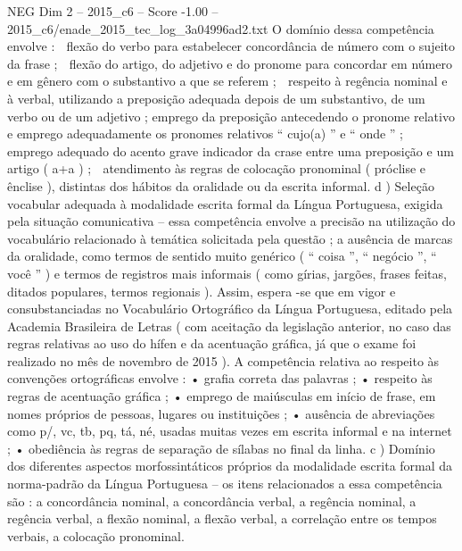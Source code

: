 \begin{textsample}{NEG Dim 2 – 2015\_c6 – Score -1.00 – 2015\_c6/enade\_2015\_tec\_log\_3a04996ad2.txt}
O domínio dessa competência envolve :  flexão do verbo para estabelecer concordância de número com o sujeito da frase ;  flexão do artigo, do adjetivo e do pronome para concordar em número e em gênero com o substantivo a que se referem ;  respeito à regência nominal e à verbal, utilizando a preposição adequada depois de um substantivo, de um verbo ou de um adjetivo ; emprego da preposição antecedendo o pronome relativo e emprego adequadamente os pronomes relativos “ cujo(a) ” e “ onde ” ;  emprego adequado do acento grave indicador da crase entre uma preposição e um artigo ( a+a ) ;  atendimento às regras de colocação pronominal ( próclise e ênclise ), distintas dos hábitos da oralidade ou da escrita informal. d ) Seleção vocabular adequada à modalidade escrita formal da Língua Portuguesa, exigida pela situação comunicativa – essa competência envolve a precisão na utilização do vocabulário relacionado à temática solicitada pela questão ; a ausência de marcas da oralidade, como termos de sentido muito genérico ( “ coisa ”, “ negócio ”, “ você ” ) e termos de registros mais informais ( como gírias, jargões, frases feitas, ditados populares, termos regionais ).
Assim, espera -se que em vigor e consubstanciadas no Vocabulário Ortográfico da Língua Portuguesa, editado pela Academia Brasileira de Letras ( com aceitação da legislação anterior, no caso das regras relativas ao uso do hífen e da acentuação gráfica, já que o exame foi realizado no mês de novembro de 2015 ).
A competência relativa ao respeito às convenções ortográficas envolve : • grafia correta das palavras ; • respeito às regras de acentuação gráfica ; • emprego de maiúsculas em início de frase, em nomes próprios de pessoas, lugares ou instituições ; • ausência de abreviações como p/, vc, tb, pq, tá, né, usadas muitas vezes em escrita informal e na internet ; • obediência às regras de separação de sílabas no final da linha. c ) Domínio dos diferentes aspectos morfossintáticos próprios da modalidade escrita formal da norma-padrão da Língua Portuguesa – os itens relacionados a essa competência são : a concordância nominal, a concordância verbal, a regência nominal, a regência verbal, a flexão nominal, a flexão verbal, a correlação entre os tempos verbais, a colocação pronominal.

\end{textsample}
